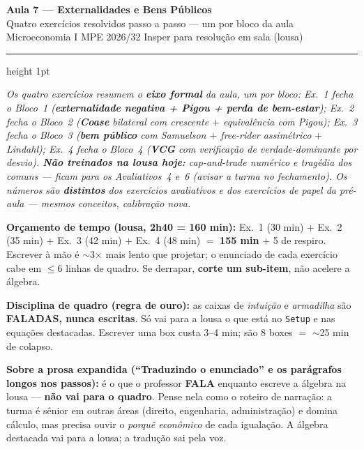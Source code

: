 \documentclass[11pt]{article}
\newcommand{\MEC}{\text{MEC}}
\begin{document}
\begin{center}
  {\LARGE\bfseries\color{insperred} Aula 7 --- Externalidades e Bens Públicos}\\[2pt]
  {\large Quatro exercícios resolvidos passo a passo --- um por bloco da aula}\\[4pt]
  {\normalsize Microeconomia I \textbullet{} MPE 2026/32 \textbullet{} Insper \textbullet{} para resolução em sala (lousa)}
\end{center}
\vspace{2pt}
{\color{insperred!40}\hrule height 1pt}
\vspace{4pt}

\noindent\textit{Os quatro exercícios resumem o \textbf{eixo formal} da aula, um por bloco: Ex.~1 fecha o Bloco~1 (\textbf{externalidade negativa + Pigou + perda de bem-estar}); Ex.~2 fecha o Bloco~2 (\textbf{Coase} bilateral com \MEC{} crescente $+$ equivalência com Pigou); Ex.~3 fecha o Bloco~3 (\textbf{bem público} com Samuelson $+$ free-rider \emph{assimétrico} $+$ Lindahl); Ex.~4 fecha o Bloco~4 (\textbf{VCG} com verificação de verdade-dominante por desvio). \textbf{Não treinados na lousa hoje:} cap-and-trade numérico e tragédia dos comuns --- ficam para os Avaliativos~4 e~6 (avisar a turma no fechamento). Os números são \textbf{distintos} dos exercícios avaliativos e dos exercícios de papel da pré-aula --- mesmos conceitos, calibração nova.}

\smallskip
\noindent\textbf{\color{insperred}Orçamento de tempo (lousa, 2h40 = 160 min):} Ex.~1 (30 min) $+$ Ex.~2 (35 min) $+$ Ex.~3 (42 min) $+$ Ex.~4 (48 min) $=$ \textbf{155 min} $+$ 5 de respiro. Escrever à mão é $\sim$3$\times$ mais lento que projetar; o enunciado de cada exercício cabe em $\le 6$ linhas de quadro. Se derrapar, \textbf{corte um sub-item}, não acelere a álgebra.

\smallskip
\noindent\textbf{\color{insperred}Disciplina de quadro (regra de ouro):} as caixas de \emph{intuição} e \emph{armadilha} são \textbf{FALADAS, nunca escritas}. Só vai para a lousa o que está no \texttt{Setup} e nas equações destacadas. Escrever uma box custa 3--4 min; são 8 boxes $=$ $\sim$25 min de colapso.

\smallskip
\noindent\textbf{\color{insperred}Sobre a prosa expandida (``Traduzindo o enunciado'' e os parágrafos longos nos passos):} é o que o professor \textbf{FALA} enquanto escreve a álgebra na lousa --- \textbf{não vai para o quadro}. Pense nela como o roteiro de narração: a turma é sênior em outras áreas (direito, engenharia, administração) e domina cálculo, mas precisa ouvir o \emph{porquê econômico} de cada igualação. A álgebra destacada vai para a lousa; a tradução sai pela voz.
\end{document}
